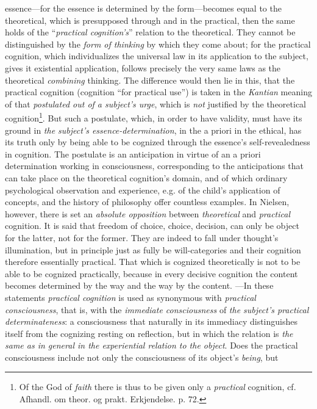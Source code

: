 \documentclass[12pt,a4paper]{book}
\begin{document}
essence---for the essence is determined by the form---becomes equal to the theoretical,
which is presupposed through and in the practical, then the same holds of the ``\emph{practical
cognition's}'' relation to the theoretical. They cannot be distinguished by the \emph{form of
thinking} by which they come about; for the practical cognition, which individualizes the universal
law in its application to the subject, gives it existential application, follows precisely the very
same laws as the theoretical \emph{combining} thinking. The difference would then lie in this, that
the practical cognition (cognition ``for practical use'') is taken in the \emph{Kantian} meaning of that
\emph{postulated out of a subject's urge}, which is \emph{not} justified by the theoretical cognition\footnote{Of
the God of \emph{faith} there is thus to be given only a \emph{practical} cognition, cf. Afhandl. om theor. og
prakt. Erkjendelse. p. 72.}. But such a postulate, which, in order to have validity, must have its
ground in \emph{the subject's essence-determination}, in the a priori in the ethical, has its truth only by
being able to be cognized through the essence's self-revealedness in cognition. The postulate is an
anticipation in virtue of an a priori determination working in consciousness, corresponding to the
anticipations that can take place on the theoretical cognition's domain, and of which ordinary
psychological observation and experience, e.g. of the child's application of concepts, and the history
of philosophy offer countless examples. In Nielsen, however, there is set an \emph{absolute opposition}
between \emph{theoretical} and \emph{practical} cognition. It is said that freedom of choice, choice, decision, can
only be object for the latter, not for the former. They are indeed to fall under thought's
illumination, but in principle just as fully be will-categories and their cognition therefore
essentially practical. That which is cognized theoretically is not to be able to be cognized
practically, because in every decisive cognition the content becomes determined by the way and the way
by the content. ---In these statements \emph{practical cognition} is used as synonymous with \emph{practical
consciousness}, that is, with the \emph{immediate consciousness} of \emph{the subject's practical determinateness}: a
consciousness that naturally in its immediacy distinguishes itself from the cognizing resting on
reflection, but in which the relation is \emph{the same as in general in the experiential relation to the
object}. Does the practical consciousness include not only the consciousness of its object's \emph{being}, but
\end{document}
